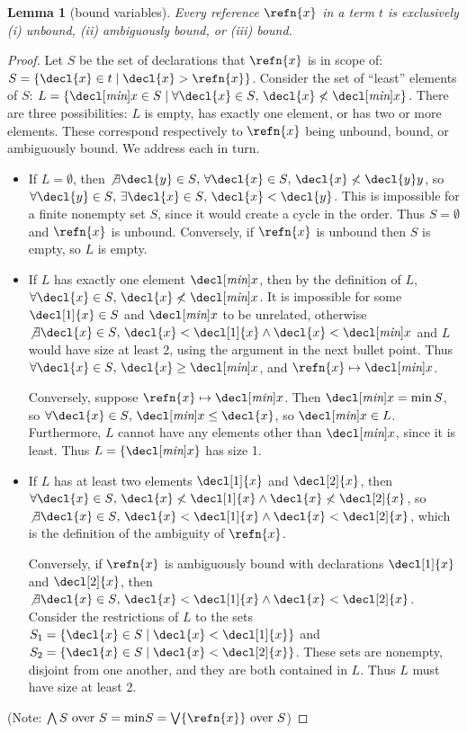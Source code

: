 \documentclass[preprint]{sigplanconf}
\theoremstyle{plain}
\newtheorem{lemma}{Lemma}
\newcommand{\bound}{\mapsto}
\newcommand{\Exists}[1]{\exists{#1},\,}
\newcommand{\NotExists}[1]{\not\exists{#1},\,}
\newcommand{\Forall}[1]{\forall{#1},\,}
\newcommand{\mand}{\wedge}
\begin{document}
\begin{lemma}[bound variables]
Every reference $\refn{x}$ in a term $t$ is exclusively (i) unbound,
(ii) ambiguously bound, or (iii) bound.
\end{lemma}
\begin{proof}
\newcommand{\declmin}[1]{\decl[\textit{min}]{#1}}
Let $S$ be the set of declarations that $\refn{x}$ is in scope of:
$S = \{\decl{x} \in t \mid \decl{x} > \refn{x}\}$.
Consider the set of ``least'' elements of $S$:
$L = \{\declmin{x} \in S \mid
   \Forall{\decl{x} \in S} \decl{x} \not< \declmin{x}\}$.
There are three possibilities: $L$ is empty, has exactly one
element, or has two or more elements. These correspond respectively to
$\refn{x}$ being unbound, bound, or ambiguously bound.  We address
each in turn.
\begin{itemize}
\item If $L = \emptyset$, then
  $\NotExists{\decl{y} \in S} \Forall{\decl{x} \in S}
  \decl{x} \not< \decl{y}y$, so
  $\Forall{\decl{y} \in S} \Exists{\decl{x} \in S}
  \decl{x} < \decl{y}$.
  This is impossible for a finite nonempty set $S$, since it would
  create a cycle in the order. Thus $S = \emptyset$ and $\refn{x}$ is
  unbound.  Conversely, if $\refn{x}$ is unbound then $S$ is empty, so
  $L$ is empty.
\item If $L$ has exactly one element $\declmin{x}$,
  then by the definition of $L$,
  $\Forall{\decl{x} \in S} \decl{x} \not< \declmin{x}$.
  It is impossible for some $\decl[1]{x} \in S$ and $\declmin{x}$ to be
  unrelated, otherwise
  $\NotExists{\decl{x} \in S}
   \decl{x} < \decl[1]{x} \mand \decl{x} < \declmin{x}$
  and $L$ would have size at least 2, using the argument in the next
  bullet point.
  Thus $\Forall{\decl{x} \in S} \decl{x} \geq \declmin{x}$,
  and $\refn{x} \bound \declmin{x}$.

  Conversely, suppose $\refn{x} \bound \declmin{x}$.
  Then $\declmin{x} = \min S$,
  so $\Forall{\decl{x} \in S} \declmin{x} \leq \decl{x}$,
  so $\declmin{x} \in L$.
  Furthermore, $L$ cannot have any elements other than $\declmin{x}$,
  since it is least. Thus $L = \{ \declmin{x} \}$ has size 1.
\item If $L$ has at least two elements $\decl[1]{x}$ and $\decl[2]{x}$,
  then $\Forall{\decl{x} \in S}
  \decl{x} \not< \decl[1]{x} \mand \decl{x} \not< \decl[2]{x}$,
  so $\NotExists{\decl{x} \in S}
  \decl{x} < \decl[1]{x} \mand \decl{x} < \decl[2]{x}$,
  which is the definition of the ambiguity of $\refn{x}$.

  Conversely, if $\refn{x}$ is ambiguously bound with declarations
  $\decl[1]{x}$ and $\decl[2]{x}$, then
  $\NotExists{\decl{x} \in S}
  \decl{x} < \decl[1]{x} \mand \decl{x} < \decl[2]{x}$.
  Consider the restrictions of $L$ to the sets
  $S_1 = \{\decl{x} \in S \mid \decl{x} < \decl[1]{x}\}$ and
  $S_2 = \{\decl{x} \in S \mid \decl{x} < \decl[2]{x}\}$.
  These sets are nonempty, disjoint from one another, and they are
  both contained in $L$. Thus $L$ must have size at least 2.
\end{itemize}
(Note: $\bigwedge S \text{ over } S
        = \text{min} S
        = \bigvee \{\refn{x}\} \text{ over } S$)
\end{proof}
\end{document}
